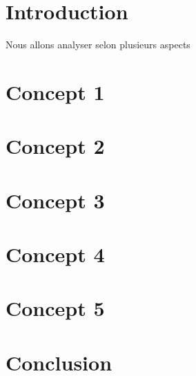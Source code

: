 \documentclass[11pt]{article}
\author{Philippe Carphin}
\date{\today}
\title{}
\begin{document}
\tableofcontents

\section{Introduction}
\label{sec:org783b5b0}

Nous allons analyser selon plusieurs aspects

\section{Concept 1}
\label{sec:orgc05652e}
\section{Concept 2}
\label{sec:org2c43b9d}
\section{Concept 3}
\label{sec:org1f25af2}
\section{Concept 4}
\label{sec:org36bc424}
\section{Concept 5}
\label{sec:org77d9e00}

\section{Conclusion}
\label{sec:org5383290}
\end{document}
